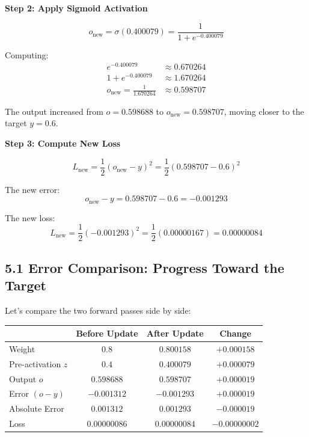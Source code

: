 \documentclass[12pt]{article}
\begin{document}
\vspace{0.2cm}

\noindent\textbf{Step 2: Apply Sigmoid Activation}

\[
o_{\text{new}} = \sigma(0.400079) = \frac{1}{1 + e^{-0.400079}}
\]

Computing:
\begin{align*}
e^{-0.400079} &\approx 0.670264 \\
1 + e^{-0.400079} &\approx 1.670264 \\
o_{\text{new}} = \frac{1}{1.670264} &\approx 0.598707
\end{align*}

The output increased from $o = 0.598688$ to $o_{\text{new}} = 0.598707$, moving closer to the target $y = 0.6$.

\vspace{0.2cm}

\noindent\textbf{Step 3: Compute New Loss}

\[
L_{\text{new}} = \frac{1}{2}(o_{\text{new}} - y)^2 = \frac{1}{2}(0.598707 - 0.6)^2
\]

The new error:
\[
o_{\text{new}} - y = 0.598707 - 0.6 = -0.001293
\]

The new loss:
\[
L_{\text{new}} = \frac{1}{2}(-0.001293)^2 = \frac{1}{2}(0.00000167) = 0.00000084
\]

\subsection*{5.1 Error Comparison: Progress Toward the Target}

Let's compare the two forward passes side by side:

\begin{center}
\begin{tabular}{|l|c|c|c|}
\hline
    & \textbf{Before Update} & \textbf{After Update} & \textbf{Change} \\
\hline
Weight               & $0.8$ & $0.800158$ & $+0.000158$ \\
Pre-activation $z$   & $0.4$ & $0.400079$ & $+0.000079$ \\
Output $o$           & $0.598688$ & $0.598707$ & $+0.000019$ \\
Error $(o - y)$      & $-0.001312$ & $-0.001293$ & $+0.000019$ \\
Absolute Error       & $0.001312$ & $0.001293$ & $-0.000019$ \\
Loss                 & $0.00000086$ & $0.00000084$ & $-0.00000002$ \\
\hline
\end{tabular}
\end{center}
\end{document}
